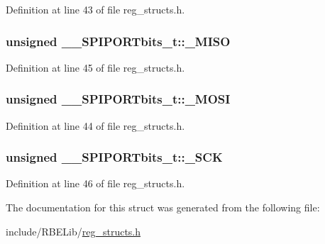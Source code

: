 Definition at line 43 of file reg\-\_\-structs.\-h.

\hypertarget{struct_____s_p_i_p_o_r_tbits__t_a495a90d64370d78287cb8ab826e3822e}{
\subsubsection[{\-\_\-\-M\-I\-S\-O}]{\setlength{\rightskip}{0pt plus 5cm}unsigned \-\_\-\-\_\-\-S\-P\-I\-P\-O\-R\-Tbits\-\_\-t\-::\-\_\-\-M\-I\-S\-O}}\label{struct_____s_p_i_p_o_r_tbits__t_a495a90d64370d78287cb8ab826e3822e}


Definition at line 45 of file reg\-\_\-structs.\-h.

\hypertarget{struct_____s_p_i_p_o_r_tbits__t_aad271e40e94776c0c0b4c69573527867}{
\subsubsection[{\-\_\-\-M\-O\-S\-I}]{\setlength{\rightskip}{0pt plus 5cm}unsigned \-\_\-\-\_\-\-S\-P\-I\-P\-O\-R\-Tbits\-\_\-t\-::\-\_\-\-M\-O\-S\-I}}\label{struct_____s_p_i_p_o_r_tbits__t_aad271e40e94776c0c0b4c69573527867}


Definition at line 44 of file reg\-\_\-structs.\-h.

\hypertarget{struct_____s_p_i_p_o_r_tbits__t_af5db81645a0530bcbb7321f2e5664209}{
\subsubsection[{\-\_\-\-S\-C\-K}]{\setlength{\rightskip}{0pt plus 5cm}unsigned \-\_\-\-\_\-\-S\-P\-I\-P\-O\-R\-Tbits\-\_\-t\-::\-\_\-\-S\-C\-K}}\label{struct_____s_p_i_p_o_r_tbits__t_af5db81645a0530bcbb7321f2e5664209}


Definition at line 46 of file reg\-\_\-structs.\-h.



The documentation for this struct was generated from the following file\-:\begin{DoxyCompactItemize}
\item 
include/\-R\-B\-E\-Lib/\hyperlink{reg__structs_8h}{reg\-\_\-structs.\-h}\end{DoxyCompactItemize}
